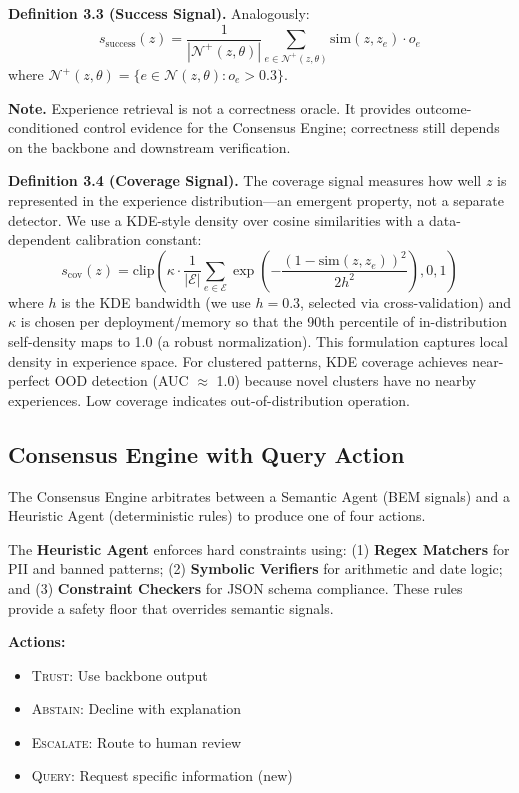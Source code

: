 \documentclass[twoside,11pt]{article}
\begin{document}
\textbf{Definition 3.3 (Success Signal).} Analogously:
\begin{equation}
    s_{\text{success}}(z) = \frac{1}{|\mathcal{N}^+(z,\theta)|} \sum_{e \in \mathcal{N}^+(z,\theta)} \text{sim}(z, z_e) \cdot o_e
\end{equation}
where $\mathcal{N}^+(z, \theta) = \{e \in \mathcal{N}(z,\theta) : o_e > 0.3\}$.

\textbf{Note.} Experience retrieval is not a correctness oracle. It provides outcome-conditioned control evidence for the Consensus Engine; correctness still depends on the backbone and downstream verification.

\textbf{Definition 3.4 (Coverage Signal).} The coverage signal measures how well $z$ is represented in the experience distribution---an emergent property, not a separate detector. We use a KDE-style density over cosine similarities with a data-dependent calibration constant:
\begin{equation}
    s_{\text{cov}}(z) = \text{clip}\left(\kappa \cdot \frac{1}{|\mathcal{E}|} \sum_{e \in \mathcal{E}} \exp\left(-\frac{(1 - \text{sim}(z, z_e))^2}{2h^2}\right), 0, 1\right)
\end{equation}
where $h$ is the KDE bandwidth (we use $h = 0.3$, selected via cross-validation) and $\kappa$ is chosen per deployment/memory so that the 90th percentile of in-distribution self-density maps to 1.0 (a robust normalization). This formulation captures local density in experience space. For clustered patterns, KDE coverage achieves near-perfect OOD detection (AUC $\approx$ 1.0) because novel clusters have no nearby experiences. Low coverage indicates out-of-distribution operation.

\subsection{Consensus Engine with Query Action}
\label{sec:consensus}

The Consensus Engine arbitrates between a Semantic Agent (BEM signals) and a Heuristic Agent (deterministic rules) to produce one of four actions.

The \textbf{Heuristic Agent} enforces hard constraints using: (1) \textbf{Regex Matchers} for PII and banned patterns; (2) \textbf{Symbolic Verifiers} for arithmetic and date logic; and (3) \textbf{Constraint Checkers} for JSON schema compliance. These rules provide a safety floor that overrides semantic signals.

\textbf{Actions:}
\begin{itemize}
    \item \textsc{Trust}: Use backbone output
    \item \textsc{Abstain}: Decline with explanation
    \item \textsc{Escalate}: Route to human review
    \item \textsc{Query}: Request specific information (new)
\end{itemize}
\end{document}
